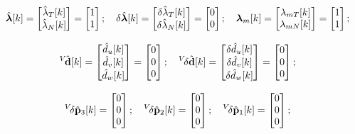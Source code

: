 \documentclass[UTF8,11pt,a4paper]{ctexart}
\newcommand{\lamhat}[1]{\hat{\lambda}_{#1}[k]}   %
\newcommand{\dhat}[1]{\hat{d}_{#1}[k]}          %
\newcommand{\ddhat}[1]{\delta\hat{d}_{#1}[k]}   %
\newcommand{\Vdhat}{{}^V\!\hat{\mathbf{d}}}
\newcommand{\Vddhat}{{}^V\!\delta\hat{\mathbf{d}}}
\begin{document}
\begin{align}
\hat{\bm{\lambda}}[k]
= \begin{bmatrix}\lamhat{T}\\\lamhat{N}\end{bmatrix}
= \begin{bmatrix}1\\1\end{bmatrix};\quad
\delta\hat{\bm{\lambda}}[k]
= \begin{bmatrix}\delta\lamhat{T}\\\delta\lamhat{N}\end{bmatrix}
= \begin{bmatrix}0\\0\end{bmatrix};\quad
\bm{\lambda}_m[k]
= \begin{bmatrix}\lambda_{mT}[k]\\\lambda_{mN}[k]\end{bmatrix}
= \begin{bmatrix}1\\1\end{bmatrix}; \notag
\end{align}

\begin{align}
\Vdhat[k]
= \begin{bmatrix}\dhat{u}\\\dhat{v}\\\dhat{w}\end{bmatrix}
= \begin{bmatrix}0\\0\\0\end{bmatrix};\quad
\Vddhat[k]
= \begin{bmatrix}\ddhat{u}\\\ddhat{v}\\\ddhat{w}\end{bmatrix}
= \begin{bmatrix}0\\0\\0\end{bmatrix}; \notag
\end{align}

\begin{align}
{}^V\!\delta\hat{\mathbf{p}}_3[k] = \begin{bmatrix}0\\0\\0\end{bmatrix};\quad
{}^V\!\delta\hat{\mathbf{p}}_2[k] = \begin{bmatrix}0\\0\\0\end{bmatrix};\quad
{}^V\!\delta\hat{\mathbf{p}}_1[k] = \begin{bmatrix}0\\0\\0\end{bmatrix}; \notag
\end{align}
\end{document}
